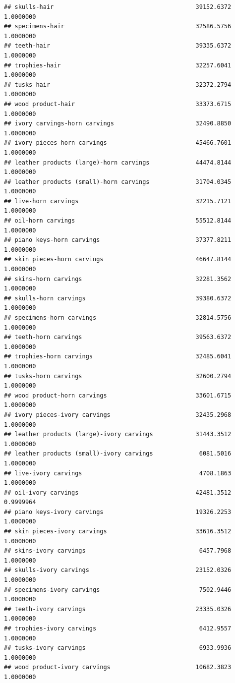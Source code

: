 \documentclass[
  12pt,
]{article}
\begin{document}
\begin{verbatim}
## skulls-hair                                        39152.6372 1.0000000
## specimens-hair                                     32586.5756 1.0000000
## teeth-hair                                         39335.6372 1.0000000
## trophies-hair                                      32257.6041 1.0000000
## tusks-hair                                         32372.2794 1.0000000
## wood product-hair                                  33373.6715 1.0000000
## ivory carvings-horn carvings                       32490.8850 1.0000000
## ivory pieces-horn carvings                         45466.7601 1.0000000
## leather products (large)-horn carvings             44474.8144 1.0000000
## leather products (small)-horn carvings             31704.0345 1.0000000
## live-horn carvings                                 32215.7121 1.0000000
## oil-horn carvings                                  55512.8144 1.0000000
## piano keys-horn carvings                           37377.8211 1.0000000
## skin pieces-horn carvings                          46647.8144 1.0000000
## skins-horn carvings                                32281.3562 1.0000000
## skulls-horn carvings                               39380.6372 1.0000000
## specimens-horn carvings                            32814.5756 1.0000000
## teeth-horn carvings                                39563.6372 1.0000000
## trophies-horn carvings                             32485.6041 1.0000000
## tusks-horn carvings                                32600.2794 1.0000000
## wood product-horn carvings                         33601.6715 1.0000000
## ivory pieces-ivory carvings                        32435.2968 1.0000000
## leather products (large)-ivory carvings            31443.3512 1.0000000
## leather products (small)-ivory carvings             6081.5016 1.0000000
## live-ivory carvings                                 4708.1863 1.0000000
## oil-ivory carvings                                 42481.3512 0.9999964
## piano keys-ivory carvings                          19326.2253 1.0000000
## skin pieces-ivory carvings                         33616.3512 1.0000000
## skins-ivory carvings                                6457.7968 1.0000000
## skulls-ivory carvings                              23152.0326 1.0000000
## specimens-ivory carvings                            7502.9446 1.0000000
## teeth-ivory carvings                               23335.0326 1.0000000
## trophies-ivory carvings                             6412.9557 1.0000000
## tusks-ivory carvings                                6933.9936 1.0000000
## wood product-ivory carvings                        10682.3823 1.0000000

\end{verbatim}
\end{document}
